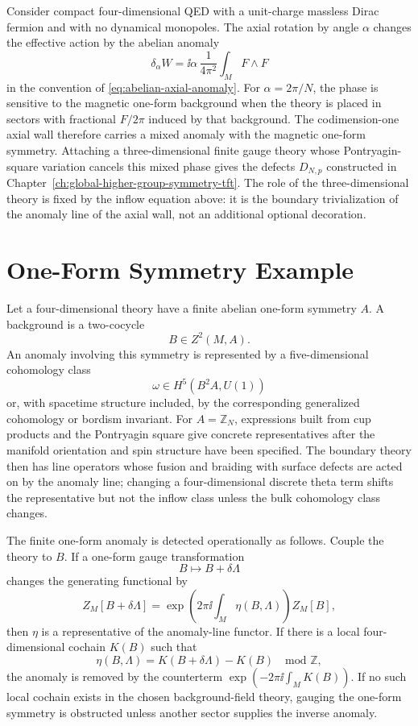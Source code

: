 \begin{example}
\label{ex:qed-noninvertible-defect-from-inflow}
Consider compact four-dimensional QED with a unit-charge massless Dirac
fermion and with no dynamical monopoles.  The axial rotation by angle
\(\alpha\) changes the effective action by the abelian anomaly
\[
  \delta_\alpha W
  =
  \ii\alpha\,\frac1{4\pi^2}
  \int_M F\wedge F
\]
in the convention of \eqref{eq:abelian-axial-anomaly}.  For
\(\alpha=2\pi/N\), the phase is sensitive to the magnetic one-form background
when the theory is placed in sectors with fractional \(F/2\pi\) induced by
that background.  The codimension-one axial wall therefore carries a mixed
anomaly with the magnetic one-form symmetry.  Attaching a three-dimensional
finite gauge theory whose Pontryagin-square variation cancels this mixed
phase gives the defects \(D_{N,p}\) constructed in
Chapter~\ref{ch:global-higher-group-symmetry-tft}.  The role of the
three-dimensional theory is fixed by the inflow equation above: it is the
boundary trivialization of the anomaly line of the axial wall, not an
additional optional decoration.
\end{example}

\section{One-Form Symmetry Example}

Let a four-dimensional theory have a finite abelian one-form symmetry \(A\).
A background is a two-cocycle
\[
  B\in Z^2(M,A).
\]
An anomaly involving this symmetry is represented by a five-dimensional
cohomology class
\[
  \omega\in H^5(B^2A,U(1))
\]
or, with spacetime structure included, by the corresponding generalized
cohomology or bordism invariant.  For \(A=\mathbb Z_N\), expressions built
from cup products and the Pontryagin square give concrete representatives
after the manifold orientation and spin structure have been specified.  The
boundary theory then has line operators whose fusion and braiding with
surface defects are acted on by the anomaly line; changing a
four-dimensional discrete theta term shifts the representative but not the
inflow class unless the bulk cohomology class changes.

The finite one-form anomaly is detected operationally as follows.  Couple the
theory to \(B\).  If a one-form gauge transformation
\[
  B\mapsto B+\delta\Lambda
\]
changes the generating functional by
\[
  Z_M[B+\delta\Lambda]
  =
  \exp\left(2\pi\ii\int_M \eta(B,\Lambda)\right)Z_M[B],
\]
then \(\eta\) is a representative of the anomaly-line functor.  If there is a
local four-dimensional cochain \(K(B)\) such that
\[
  \eta(B,\Lambda)=K(B+\delta\Lambda)-K(B)
  \quad\text{mod }\mathbb Z,
\]
the anomaly is removed by the counterterm
\(\exp(-2\pi\ii\int_MK(B))\).  If no such local cochain exists in the chosen
background-field theory, gauging the one-form symmetry is obstructed unless
another sector supplies the inverse anomaly.

